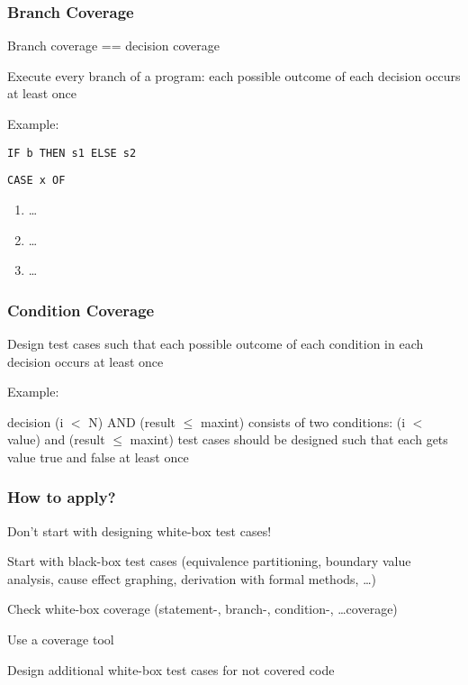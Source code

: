 \subsubsection{Branch Coverage}

\begin{itemize*}
	\item Branch coverage == decision coverage
	\item Execute every branch of a program: each possible outcome of each decision occurs at least once
	\item Example:
	\begin{itemize*}
		\item \verb|IF b THEN s1 ELSE s2|
		\item \verb|CASE x OF|
		\begin{enumerate}
			\item \ldots
			\item \ldots
			\item \ldots
		\end{enumerate}
	\end{itemize*}
\end{itemize*}


\subsubsection{Condition Coverage}

\begin{itemize*}
	\item Design test cases such that each possible outcome of each condition in each decision occurs at least once
	\item Example:
	\begin{itemize*}
		\item decision (i $<$ N) AND (result $\leq$ maxint) consists of two conditions: (i $<$ value) and (result $\leq$ maxint) test cases should be designed such that each gets value
		true and false at least once
	\end{itemize*}
\end{itemize*}


\subsubsection{How to apply?}

\begin{itemize*}
	\item Don't start with designing white-box test cases!
	\item Start with black-box test cases
	(equivalence partitioning, boundary value analysis, cause effect graphing, derivation with formal methods, \ldots)
	\item Check white-box coverage (statement-, branch-, condition-, \ldots coverage)
	\item Use a coverage tool
	\item Design additional white-box test cases for not covered code
\end{itemize*}

